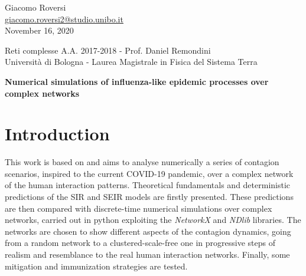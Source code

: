 \documentclass[DIV=12, BCOR=0pt]{scrartcl}  %
\begin{document}
%	
%



\begin{flushright}
	{\large Giacomo Roversi} \\ 
	{\small \href{mailto:giacomo.roversi2@studio.unibo.it}{giacomo.roversi2@studio.unibo.it} }\\
	\vskip0.15in
	{\large November 16, 2020}
\end{flushright}

\begin{flushleft}
	{\Large \color{gray}
		Reti complesse A.A. 2017-2018 - Prof. Daniel Remondini  \\
		Università di Bologna - Laurea Magistrale in Fisica del Sistema Terra}


	\vskip0.2in
	{\huge\textbf{Numerical simulations of influenza-like epidemic processes over complex networks}} 
	\vskip0.33in
	
\end{flushleft}
	
	\section{Introduction}
	\label{sec:intro}
	This work is based on \citet{Pastor-Satorras} %
	and aims to analyse numerically a series of contagion scenarios, inspired to the current COVID-19 pandemic, over a complex network of the human interaction patterns. 
 	Theoretical fundamentals and deterministic predictions of the SIR and SEIR models are firstly presented. These predictions are then compared with discrete-time numerical simulations over complex networks, carried out in python exploiting the \textit{NetworkX} and \textit{NDlib} libraries. The networks are chosen to show different aspects of the contagion dynamics, going from a random network to a clustered-scale-free one in progressive steps of realism and resemblance to the real human interaction networks. 
 	Finally, some mitigation and immunization strategies are tested.
  
\end{document}
